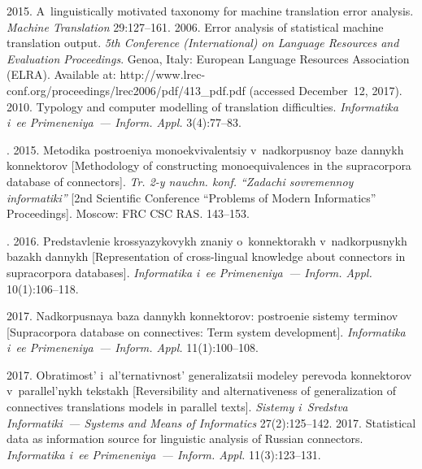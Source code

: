 \begin{multicols}{2}
{{\begin{thebibliography}{99}
 2015. A~linguistically motivated taxonomy for 
machine translation error analysis. \textit{Machine Translation} 29:127--161.
 2006. Error analysis of 
statistical machine translation output. \textit{5th Conference (International) on 
Language Resources and Evaluation Proceedings}. Genoa, Italy: European 
Language Resources Association (ELRA). Available at: 
{\sf http://www.lrec-conf.org/proceedings/lrec2006/pdf/413\_pdf.pdf} 
(accessed December~12, 2017).
 2010. 
Typology and computer modelling of translation
 difficulties. \textit{Informatika 
i~ee Primeneniya~--- Inform. Appl.} 3(4):77--83.

. 2015. Metodika postroeniya monoekvivalentsiy 
v~nadkorpusnoy baze dannykh konnektorov [Methodology of constructing 
monoequivalences in the supracorpora database of connectors]. \textit{Tr. 2-y 
nauchn. konf. ``Zadachi sovremennoy informatiki''} [2nd Scientific Conference 
``Problems of Modern Informatics'' Proceedings]. Moscow: FRC CSC RAS. 
143--153.

. 2016. Predstavlenie krossyazykovykh znaniy 
o~konnektorakh v~nadkorpusnykh bazakh dannykh [Representation of  
cross-lingual knowledge about
 connectors in supracorpora databases]. 
\textit{Informatika i~ee Primeneniya~--- Inform. Appl.} 10(1):106--118.

 2017. 
Nadkorpusnaya baza dannykh konnektorov: postroenie sistemy terminov 
[Supracorpora database on connectives: Term system development]. 
\textit{Informatika i~ee Primeneniya~--- Inform. Appl.} 11(1):100--108.

 2017. 
Obratimost' i~al'ternativnost' generalizatsii modeley perevoda konnektorov 
v~parallel'nykh tekstakh [Reversibility and alternativeness of generalization of 
connectives translations models in parallel texts]. \textit{Sistemy i~Sredstva 
Informatiki~--- Systems and Means of Informatics} 27(2):125--142.
 2017. Statistical data as 
information source for linguistic analysis of Russian connectors. 
\textit{Informatika i~ee Primeneniya~--- Inform. Appl.} 11(3):123--131.


\end{thebibliography} } }

\end{multicols}

